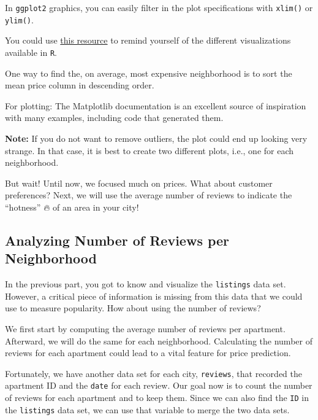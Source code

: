 \documentclass[
  11pt,
]{article}
\newenvironment{tips}[1]
  {
  \begin{itemize}
  \footnotesize
  \renewcommand{\labelitemi}{
    \raisebox{-.7\height}[0pt][0pt]{
      {\setkeys{Gin}{width=3em,keepaspectratio}
        \texttt{[image: images/\#1.png]}}
    }
  }
  \setlength{\fboxsep}{1em}
  \begin{rbox}
  \item
  }
  {
  \end{rbox}
  \end{itemize}
  }
\newenvironment{tipsp}[1]
  {
  \begin{itemize}
  \footnotesize
  \renewcommand{\labelitemi}{
    \raisebox{-.7\height}[0pt][0pt]{
      {\setkeys{Gin}{width=3em,keepaspectratio}
        \texttt{[image: images/\#1.png]}}
    }
  }
  \setlength{\fboxsep}{1em}
  \begin{pbox}
  \item
  }
  {
  \end{pbox}
  \end{itemize}
  }
\begin{document}
\begin{tips}r
In \texttt{ggplot2} graphics, you can easily filter in the plot specifications with \texttt{xlim()} or \texttt{ylim()}.

You could use \href{https://www.r-graph-gallery.com}{this resource} to remind yourself of the different visualizations available in \texttt{R}.

\end{tips}

\begin{tipsp}p
One way to find the, on average, most expensive neighborhood is to sort the mean price column in descending order.

For plotting: The Matplotlib documentation is an excellent source of inspiration with many examples, including code that generated them.

\textbf{Note:} If you do not want to remove outliers, the plot could end up looking very strange.
In that case, it is best to create two different plots, i.e., one for each neighborhood.

\end{tipsp}

But wait!
Until now, we focused much on prices.
What about customer preferences?
Next, we will use the average number of reviews to indicate the ``hotness'' 🔥 of an area in your city!

\hypertarget{analyzing-number-of-reviews-per-neighborhood}{%
\subsection{Analyzing Number of Reviews per Neighborhood}\label{analyzing-number-of-reviews-per-neighborhood}}

In the previous part, you got to know and visualize the \texttt{listings} data set.
However, a critical piece of information is missing from this data that we could use to measure popularity.
How about using the number of reviews?

We first start by computing the average number of reviews per apartment.
Afterward, we will do the same for each neighborhood.
Calculating the number of reviews for each apartment could lead to a vital feature for price prediction.

Fortunately, we have another data set for each city, \texttt{reviews}, that recorded the apartment ID and the \texttt{date} for each review.
Our goal now is to count the number of reviews for each apartment and to keep them.
Since we can also find the \texttt{ID} in the \texttt{listings} data set, we can use that variable to merge the two data sets.
\end{document}
